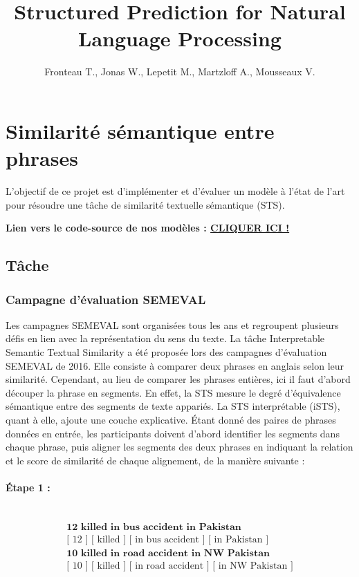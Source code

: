 \documentclass[a4paper, twoside, 11pt]{article}
\title{Structured Prediction for Natural Language Processing}
\author{Fronteau T., Jonas W., Lepetit M., Martzloff A., Mousseaux V.}
\begin{document}
 \maketitle
 \section{Similarité sémantique entre phrases}
    L'objectif de ce projet est d'implémenter et d'évaluer un modèle à l’état de l’art pour résoudre une tâche de similarité textuelle sémantique (STS).

  \textbf{Lien vers le code-source de nos modèles : \href{https://github.com/timfronteau/Semantic_chunk_identification}{CLIQUER ICI !}} \hfill \linebreak

    \subsection{Tâche}

        \subsubsection{Campagne d’évaluation SEMEVAL}

    Les campagnes SEMEVAL sont organisées tous les ans et regroupent plusieurs défis en lien avec la représentation du sens du texte. La tâche Interpretable Semantic Textual Similarity a été proposée lors des campagnes d’évaluation SEMEVAL de 2016. Elle consiste à comparer deux phrases en anglais selon leur similarité. Cependant, au lieu de comparer les phrases entières, ici il faut d’abord découper la phrase en segments. En effet, la STS mesure le degré d'équivalence sémantique entre des segments de texte appariés. La STS interprétable (iSTS), quant à elle, ajoute une couche explicative. Étant donné des paires de phrases données en entrée, les participants doivent d'abord identifier les segments dans chaque phrase, puis aligner les segments des deux phrases en indiquant la relation et le score de similarité de chaque alignement, de la manière suivante : \hfill \linebreak
 \paragraph{Étape 1 :}\mbox{}\\
 \begin{eqnarray*}
\textbf{12 killed in bus accident in Pakistan}\\
\textrm{[ 12 ] [ killed ] [ in bus accident ] [ in Pakistan ]}\\
\textbf{10 killed in road accident in NW Pakistan}\\
\textrm{[ 10 ] [ killed ] [ in road accident ] [ in NW Pakistan ]}\\
\end{eqnarray*}
\end{document}
